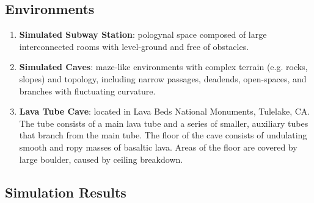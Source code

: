 \documentclass[letterpaper]{article} %
\newcommand{\ph}[1]{{\textbf{#1}:}} %
\begin{document}
\subsection{Environments}
\begin{enumerate}
    \item \ph{Simulated Subway Station} pologynal space composed of large interconnected rooms with level-ground and free of obstacles.
    \item \ph{Simulated Caves} maze-like environments with complex terrain (e.g. rocks, slopes) and topology, including narrow passages, deadends, open-spaces, and branches with fluctuating curvature.  
    \item \ph{Lava Tube Cave} located in Lava Beds National Monuments, Tulelake, CA. The tube consists of a main lava tube and a series of smaller, auxiliary tubes that branch from the main tube. The floor of the cave consists of undulating smooth and ropy masses of basaltic lava. Areas of the floor are covered by large boulder, caused by ceiling breakdown. 
\end{enumerate}

\subsection{Simulation Results}
\end{document}
